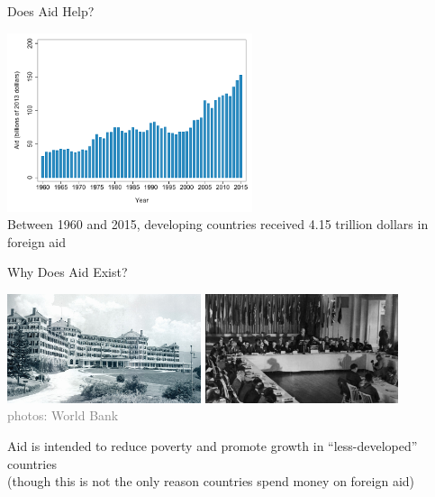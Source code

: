 \documentclass[10pt,xcolor=table,ignorenonframetext,handout,aspectratio=169]{beamer}
\begin{document}

\begin{frame}{Does Aid Help?}

\begin{center}
		\includegraphics[width=7.2cm]{fig/aid-by-year.pdf} \\
		
		Between 1960 and 2015, developing countries received 4.15 trillion dollars in foreign aid 
\end{center}

\end{frame}



\begin{frame}{Why Does Aid Exist?}

\begin{center}
	\includegraphics[height=3.2cm]{photos/bretton-woods-1944-WB-photo.jpg} \includegraphics[height=3.2cm]{photos/BW-conf-hall-1944-WB-photo.jpg} \\
	\textcolor{gray}{\tiny{photos:  World Bank}}
	
	\medskip
	\medskip
	
	Aid is intended to reduce poverty and promote growth in ``less-developed'' countries \\
	(though this is not the only reason countries spend money on foreign aid)
\end{center}

\end{frame}
\end{document}
